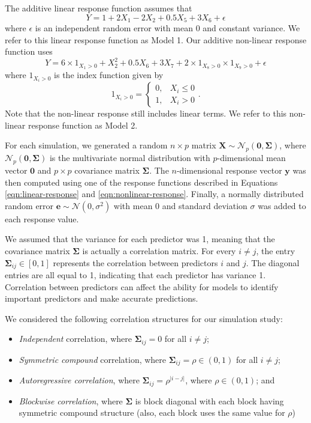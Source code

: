 \documentclass[final,onefignum,onetabnum]{siuro210301}
\begin{document}
	The additive linear response function assumes that
	\begin{equation}\label{eqn:linear-response}
		Y = 1 + 2X_1 - 2X_2 + 0.5X_5 + 3X_6 + \epsilon
	\end{equation}
	where $\epsilon$ is an independent random error with mean 0 and constant variance. We refer to this linear response function as Model 1. Our additive non-linear response function uses
	\begin{equation}\label{eqn:nonlinear-response}
		Y = 6\times 1_{X_1 > 0} + X_2^2 + 0.5X_6 + 3X_7 + 2\times 1_{X_8 > 0}\times 1_{X_9>0} + \epsilon
	\end{equation}
	where $1_{X_i>0}$ is the index function given by
	\begin{equation}
		1_{X_i > 0} = \left\{\begin{array}{rl}
			0, & X_i \leq 0 \\
			1, & X_i > 0
		\end{array}\right..
	\end{equation}
	Note that the non-linear response still includes linear terms. We refer to this non-linear response function as Model 2.
	
	For each simulation, we generated a random $n\times p$ matrix $\mathbf{X}\sim \mathcal{N}_p(\mathbf{0}, \mathbf{\Sigma})$, where $\mathcal{N}_p(\mathbf{0}, \mathbf{\Sigma})$ is the multivariate normal distribution with $p$-dimensional mean vector $\mathbf{0}$ and $p \times p$ covariance matrix $\mathbf{\Sigma}$. The $n$-dimensional response vector $\mathbf{y}$ was then computed using one of the response functions described in Equations \ref{eqn:linear-response} and \ref{eqn:nonlinear-response}. Finally, a normally distributed random error $\mathbf{e}\sim \mathcal{N}(0, \sigma^2)$ with mean 0 and standard deviation $\sigma$ was added to each response value.
	
	We assumed that the variance for each predictor was 1, meaning that the covariance matrix $\mathbf{\Sigma}$ is actually a correlation matrix. For every $i \neq j$, the entry $\mathbf{\Sigma}_{ij}\in [0, 1]$ represents the correlation between predictors $i$ and $j$. The diagonal entries are all equal to 1, indicating that each predictor has variance 1. Correlation between predictors can affect the ability for models to identify important predictors and make accurate predictions.
	
	We considered the following correlation structures for our simulation study:
	\begin{itemize}\itemsep0pt
		\item \textit{Independent} correlation, where $\mathbf{\Sigma}_{ij} = 0$ for all $i \neq j$;
		\item \textit{Symmetric compound} correlation, where $\mathbf{\Sigma}_{ij} = \rho \in (0, 1)$ for all $i \neq j$;
		\item \textit{Autoregressive correlation}, where $\mathbf{\Sigma}_{ij} = \rho^{\vert i - j \vert}$, where $\rho \in (0, 1)$; and
		\item \textit{Blockwise correlation}, where $\mathbf{\Sigma}$ is block diagonal with each block having symmetric compound structure (also, each block uses the same value for $\rho$)
	\end{itemize}
	
\end{document}
